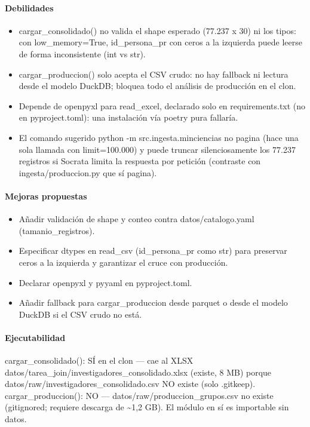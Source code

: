 \paragraph{Debilidades}
\begin{itemize}
  \item cargar\_consolidado() no valida el shape esperado (77.237 x 30) ni los tipos: con low\_memory=True, id\_persona\_pr con ceros a la izquierda puede leerse de forma inconsistente (int vs str).
  \item cargar\_produccion() solo acepta el CSV crudo: no hay fallback ni lectura desde el modelo DuckDB; bloquea todo el análisis de producción en el clon.
  \item Depende de openpyxl para read\_excel, declarado solo en requirements.txt (no en pyproject.toml): una instalación vía poetry pura fallaría.
  \item El comando sugerido python -m src.ingesta.minciencias no pagina (hace una sola llamada con limit=100.000) y puede truncar silenciosamente los 77.237 registros si Socrata limita la respuesta por petición (contraste con ingesta/produccion.py que sí pagina).
\end{itemize}

\paragraph{Mejoras propuestas}
\begin{itemize}
  \item Añadir validación de shape y conteo contra datos/catalogo.yaml (tamanio\_registros).
  \item Especificar dtypes en read\_csv (id\_persona\_pr como str) para preservar ceros a la izquierda y garantizar el cruce con producción.
  \item Declarar openpyxl y pyyaml en pyproject.toml.
  \item Añadir fallback para cargar\_produccion desde parquet o desde el modelo DuckDB si el CSV crudo no está.
\end{itemize}

\paragraph{Ejecutabilidad}
cargar\_consolidado(): SÍ en el clon --- cae al XLSX datos/tarea\_join/investigadores\_consolidado.xlsx (existe, 8 MB) porque datos/raw/investigadores\_consolidado.csv NO existe (solo .gitkeep). cargar\_produccion(): NO --- datos/raw/produccion\_grupos.csv no existe (gitignored; requiere descarga de \textasciitilde{}1,2 GB). El módulo en sí es importable sin datos.

